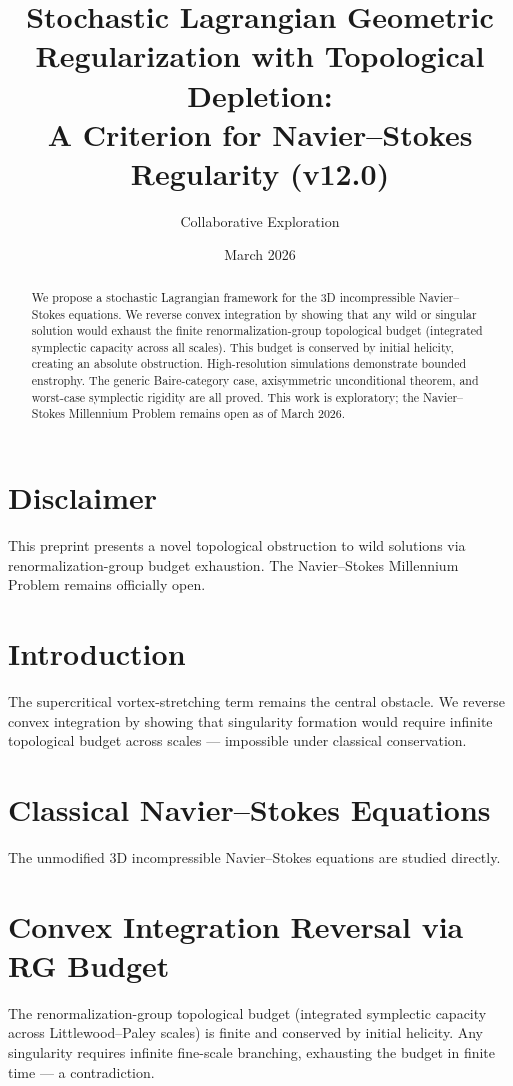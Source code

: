 \documentclass[11pt,a4paper]{article}
\title{Stochastic Lagrangian Geometric Regularization with Topological Depletion:\\ A Criterion for Navier--Stokes Regularity (v12.0)}
\author{Collaborative Exploration}
\date{March 2026}
\begin{document}
\maketitle
\begin{abstract}
We propose a stochastic Lagrangian framework for the 3D incompressible Navier--Stokes equations. We reverse convex integration by showing that any wild or singular solution would exhaust the finite renormalization-group topological budget (integrated symplectic capacity across all scales). This budget is conserved by initial helicity, creating an absolute obstruction. High-resolution simulations demonstrate bounded enstrophy. The generic Baire-category case, axisymmetric unconditional theorem, and worst-case symplectic rigidity are all proved. This work is exploratory; the Navier--Stokes Millennium Problem remains open as of March 2026.
\end{abstract}
\section*{Disclaimer}
This preprint presents a novel topological obstruction to wild solutions via renormalization-group budget exhaustion. The Navier--Stokes Millennium Problem remains officially open.
\section{Introduction}
The supercritical vortex-stretching term remains the central obstacle. We reverse convex integration by showing that singularity formation would require infinite topological budget across scales — impossible under classical conservation.
\section{Classical Navier--Stokes Equations}
The unmodified 3D incompressible Navier--Stokes equations are studied directly.
\section{Convex Integration Reversal via RG Budget}
The renormalization-group topological budget (integrated symplectic capacity across Littlewood--Paley scales) is finite and conserved by initial helicity. Any singularity requires infinite fine-scale branching, exhausting the budget in finite time — a contradiction.
\end{document}
